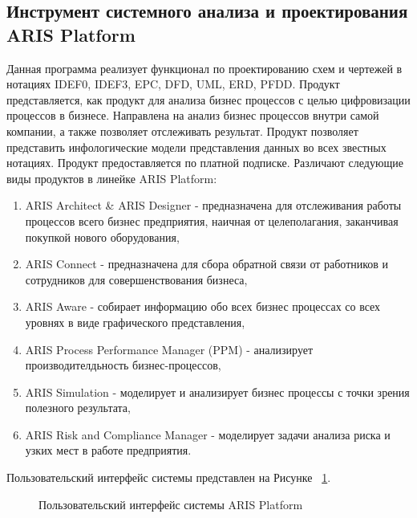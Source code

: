 \subsection{Инструмент системного анализа и проектирования ARIS Platform}\label{sec:ch1/sec6/sub1}
Данная программа реализует функционал по проектированию схем и чертежей в нотациях IDEF0, IDEF3, EPC, DFD, UML, ERD, PFDD.
Продукт представляется, как продукт для анализа бизнес процессов с целью цифровизации процессов в бизнесе. Направлена на анализ бизнес процессов внутри самой компании, а также позволяет отслеживать результат. Продукт позволяет представить инфологические модели представления данных во всех звестных нотациях. Продукт предоставляется по платной подписке.
Различают следующие виды продуктов в линейке ARIS Platform:
\begin{enumerate}
    \item ARIS Architect & ARIS Designer - предназначена для отслеживания работы процессов всего бизнес предприятия, наичная от целеполагания, заканчивая покупкой нового оборудования,
    \item ARIS Connect - предназначена для сбора обратной связи от работников и сотрудников для совершенствования бизнеса,
    \item ARIS Aware - собирает информацию обо всех бизнес процессах со всех уровнях в виде графического представления,
    \item ARIS Process Performance Manager (PPM) - анализирует производителдьность бизнес-процессов,
    \item ARIS Simulation - моделирует и анализирует бизнес процессы с точки зрения полезного результата,
    \item ARIS Risk and Compliance Manager - моделирует задачи анализа риска и узких мест в работе предприятия.
\end{enumerate}
Пользовательский интерфейс системы представлен на Рисунке ~\cref{fig:ARIS}.
\begin{figure}[ht1]
    \caption{Пользовательский интерфейс системы ARIS Platform}\label{fig:ARIS}
\end{figure}

